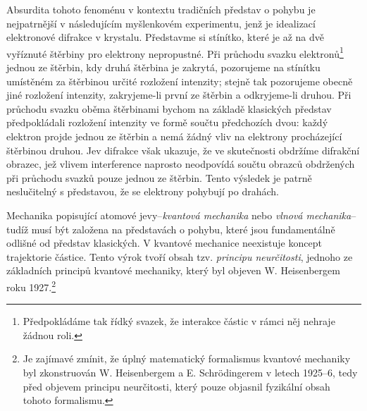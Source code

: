 Absurdita tohoto fenoménu v kontextu tradičních představ o pohybu je nejpatrnější v následujícím myšlenkovém experimentu, jenž je idealizací elektronové difrakce v krystalu. Představme si stínítko, které je až na dvě vyříznuté štěrbiny pro elektrony nepropustné. Při průchodu svazku elektronů\footnote{Předpokládáme tak řídký svazek, že interakce částic v rámci něj nehraje žádnou roli.} jednou ze štěrbin, kdy druhá štěrbina je zakrytá, pozorujeme na stínítku umístěném za štěrbinou určité rozložení intenzity; stejně tak pozorujeme obecně jiné rozložení intenzity, zakryjeme-li první ze štěrbin a odkryjeme-li druhou. Při průchodu svazku oběma štěrbinami bychom na základě klasických představ předpokládali rozložení intenzity ve formě součtu předchozích dvou: každý elektron projde jednou ze štěrbin a nemá žádný vliv na elektrony procházející štěrbinou druhou. Jev difrakce však ukazuje, že ve skutečnosti obdržíme difrakční obrazec, jež vlivem interference naprosto neodpovídá součtu obrazců obdržených při průchodu svazků pouze jednou ze štěrbin. Tento výsledek je patrně neslučitelný s představou, že se elektrony pohybují po drahách.\par
Mechanika popisující atomové jevy--\emph{kvantová mechanika} nebo \emph{vlnová mechanika}--tudíž musí být založena na představách o pohybu, které jsou fundamentálně odlišné od představ klasických. V kvantové mechanice neexistuje koncept trajektorie částice. Tento výrok tvoří obsah tzv. \emph{principu neurčitosti}, jednoho ze základních principů kvantové mechaniky, který byl objeven W. Heisenbergem roku 1927.\footnote{Je zajímavé zmínit, že úplný matematický formalismus kvantové mechaniky byl zkonstruován W. Heisenbergem a E. Schrödingerem v letech 1925--6, tedy před objevem principu neurčitosti, který pouze objasnil fyzikální obsah tohoto formalismu.}\par
